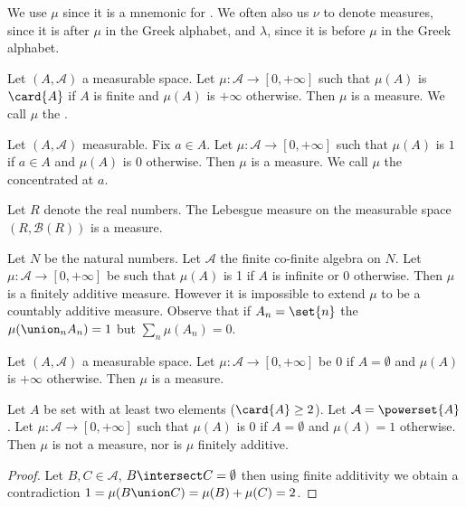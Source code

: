 We use $\mu$ since it
is a mnemonic for .
We often also us
$\nu$ to denote measures,
since it is after
$\mu$ in the Greek alphabet,
and $\lambda$, since
it is before
$\mu$ in the Greek alphabet.


\begin{expl}
Let $(A, \mathcal{A})$ a measurable space.
Let $\mu: \mathcal{A} \to [0, +\infty]$ such that
$\mu(A)$ is $\card{A}$ if $A$ is finite
and $\mu(A)$ is $+\infty$ otherwise.
Then $\mu$ is a measure.
We call $\mu$ the
.
\end{expl}

\begin{expl}
Let $(A, \mathcal{A})$ measurable.
Fix $a \in A$.
Let $\mu: \mathcal{A} \to [0, +\infty]$ such
that $\mu(A)$ is $1$ if $a \in A$ and
$\mu(A)$ is $0$ otherwise.
Then $\mu$ is a measure.
We call $\mu$ the
concentrated at $a$.
\end{expl}

\begin{expl}
Let $R$ denote the real numbers.
The Lebesgue measure on the measurable
space $(R, \mathcal{B}(R))$ is a measure.
\end{expl}

\begin{expl}
Let $N$ be the natural numbers.
Let $\mathcal{A}$ the finite
co-finite algebra on $N$.
Let $\mu: \mathcal{A} \to [0, +\infty]$
be such that $\mu(A)$ is 1 if
$A$ is infinite or 0 otherwise.
Then $\mu$ is a finitely additive measure.
However it is impossible to extend
$\mu$ to be a countably additive measure.
Observe that if $A_n = \set{n}$ the
$\mu(\union_{n} A_n) = 1$ but
$\sum_{n} \mu(A_n) = 0$.
\end{expl}

\begin{expl}
Let $(A, \mathcal{A})$ a measurable
space.
Let $\mu: \mathcal{A} \to [0, +\infty]$
be $0$ if $A = \emptyset$ and
$\mu(A)$ is $+\infty$ otherwise.
Then $\mu$ is a measure.
\end{expl}

\begin{expl}
Let $A$ be set with at least
two elements ($\card{A} \geq 2$).
Let $\mathcal{A} = \powerset{A}$.
Let $\mu: \mathcal{A} \to [0, +\infty]$
such that $\mu(A)$ is $0$ if $A = \emptyset$
and $\mu(A) = 1$ otherwise.
Then $\mu$ is not a measure,
nor is $\mu$ finitely additive.
\begin{proof}
Let $B, C \in \mathcal{A}$,
$B \intersect C = \emptyset$
then using finite additivity
we obtain a contradiction
$
1 = \mu(B \union C) = \mu(B) + \mu(C) = 2
$.
\end{proof}
\end{expl}
